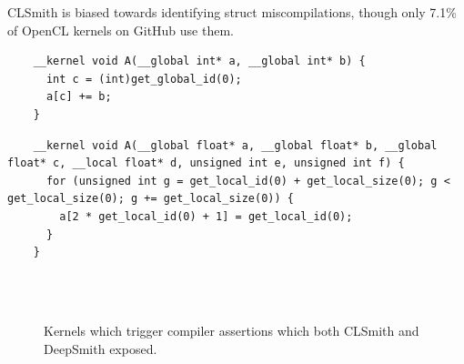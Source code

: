 CLSmith is biased towards identifying struct miscompilations, though only 7.1\% of OpenCL kernels on GitHub use them.


\newsavebox{\IntelPtrAssertion}
\begin{lrbox}{\IntelPtrAssertion}
  \hspace{1.5em}
  \begin{lstlisting}
    __kernel void A(__global int* a, __global int* b) {
      int c = (int)get_global_id(0);
      a[c] += b;
    }
  \end{lstlisting}
\end{lrbox}

\newsavebox{\IntelScalarAssertion}
\begin{lrbox}{\IntelScalarAssertion}
  \hspace{1.5em}
  \begin{lstlisting}
    __kernel void A(__global float* a, __global float* b, __global float* c, __local float* d, unsigned int e, unsigned int f) {
      for (unsigned int g = get_local_id(0) + get_local_size(0); g < get_local_size(0); g += get_local_size(0)) {
        a[2 * get_local_id(0) + 1] = get_local_id(0);
      }
    }
  \end{lstlisting}
\end{lrbox}

\begin{figure}
  \centering %
  \\%
  \\%
  \caption{Kernels which trigger compiler assertions which both CLSmith and DeepSmith exposed.}%
  \label{lst:compiler-crashes}%
\end{figure}

